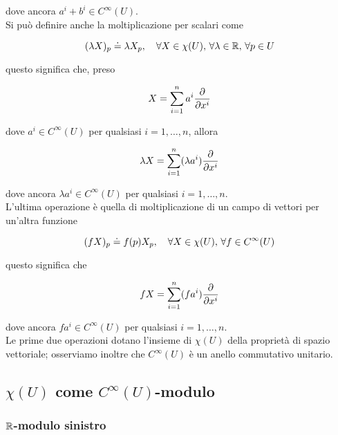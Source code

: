 dove ancora $ a^{i}+b^{i} \in C^{\infty}(U) $. \\
Si può definire anche la moltiplicazione per scalari come

\begin{equation}
	(\lambda X)_{p} \doteq \lambda X_{p} \qcomma \forall X \in \chi(U), \, \forall \lambda \in \R, \, \forall p \in U
\end{equation}

questo significa che, preso

\begin{equation}
	X = \sum_{i=1}^{n} a^{i} \pdv{x^{i}}
\end{equation}

dove $ a^{i} \in C^{\infty}(U) $ per qualsiasi $ i = 1, \dots, n $, allora

\begin{equation}
	\lambda X = \sum_{i=1}^{n} (\lambda a^{i}) \pdv{x^{i}}
\end{equation}

dove ancora $ \lambda a^{i} \in C^{\infty}(U) $ per qualsiasi $ i = 1, \dots, n $. \\
L'ultima operazione è quella di moltiplicazione di un campo di vettori per un'altra funzione

\begin{equation}
	(f X)_{p} \doteq f(p) X_{p} \qcomma \forall X \in \chi(U), \, \forall f \in C^{\infty}(U)
\end{equation}

questo significa che

\begin{equation}
	f X = \sum_{i=1}^{n} (f a^{i}) \pdv{x^{i}}
\end{equation}

dove ancora $ f a^{i} \in C^{\infty}(U) $ per qualsiasi $ i=1,\dots,n $. \\
Le prime due operazioni dotano l'insieme di $ \chi(U) $ della proprietà di spazio vettoriale; osserviamo inoltre che $ C^{\infty}(U) $ è un anello commutativo unitario.

\subsection{$ \chi(U) $ come $ C^{\infty}(U) $-modulo}

\subsubsection{$ \mathbb{R} $-modulo sinistro}

